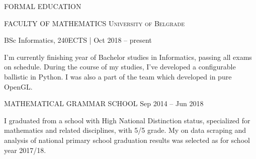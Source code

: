 \begin{minipage}[t]{\linewidth}\vspace{\sectionTopmargin}
{\titleFont\light FORMAL EDUCATION}\newline

\vspace{\titleBottomMargin}
{\subtitleFont\bold FACULTY OF MATHEMATICS \vspace{0.75mm}\newline\extraLight\scshape University of Belgrade}\newline

{\vspace{-3mm}\dateFont\extraLight BSc Informatics, 240ECTS | Oct 2018 -- present}\newline

\vspace{-3mm}
{\contentFont I'm currently finishing  year of Bachelor studies in Informatics, passing all exams on schedule. %
During the course of my studies, I've developed a configurable ballistic  in Python. I was also a part of the team which developed  in pure OpenGL}.
\end{minipage}\newline%
%
\begin{minipage}[t]{\linewidth}\vspace{\subsectionSpace}
{\subtitleFont\bold MATHEMATICAL GRAMMAR SCHOOL}\newline
{\vfill\vspace{\dateTopMargin}\dateFont\extraLight Sep 2014 -- Jun 2018\alignRight}\linebreak\newline

\vspace{\contentTopMargin}
{\contentFont I graduated from a school with High National Distinction status, specialized for mathematics and related disciplines, with 5/5 grade. My  on data scraping and analysis of national primary school graduation results was selected as  for school year 2017/18.}
\end{minipage}\newline%